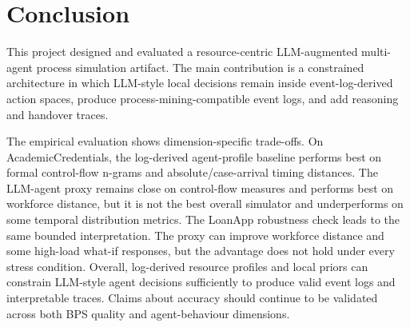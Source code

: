 \section{Conclusion}\label{conclusion}

This project designed and evaluated a resource-centric LLM-augmented
multi-agent process simulation artifact. The main contribution is a
constrained architecture in which LLM-style local decisions remain
inside event-log-derived action spaces, produce
process-mining-compatible event logs, and add reasoning and handover
traces.

The empirical evaluation shows dimension-specific trade-offs. On
AcademicCredentials, the log-derived agent-profile baseline performs
best on formal control-flow n-grams and absolute/case-arrival timing
distances. The LLM-agent proxy remains close on control-flow measures
and performs best on workforce distance, but it is not the best overall
simulator and underperforms on some temporal distribution metrics. The
LoanApp robustness check leads to the same bounded interpretation. The
proxy can improve workforce distance and some high-load what-if
responses, but the advantage does not hold under every stress condition.
Overall, log-derived resource profiles and local priors can constrain
LLM-style agent decisions sufficiently to produce valid event logs and
interpretable traces. Claims about accuracy should continue to be
validated across both BPS quality and agent-behaviour dimensions.
